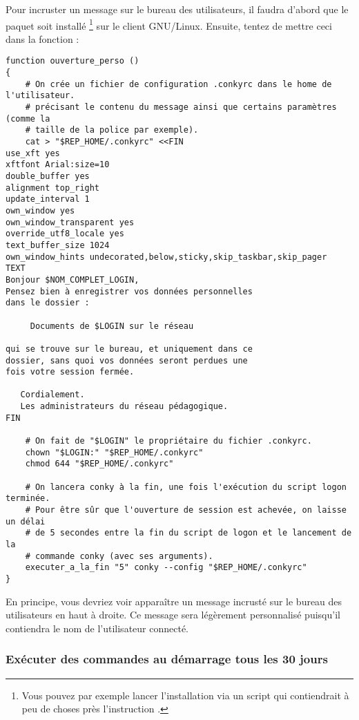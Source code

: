 Pour incruster un message sur le bureau des utilisateurs, il
faudra d'abord que le paquet  soit installé%
\footnote{Vous pouvez par exemple lancer l'installation via
un script  qui contiendrait à peu de
choses près l'instruction .}
sur le client GNU/Linux.
Ensuite, tentez de mettre ceci dans
la fonction  :
%
\begin{lstlisting}
function ouverture_perso ()
{
    # On crée un fichier de configuration .conkyrc dans le home de l'utilisateur.
    # précisant le contenu du message ainsi que certains paramètres (comme la
    # taille de la police par exemple).
    cat > "$REP_HOME/.conkyrc" <<FIN
use_xft yes
xftfont Arial:size=10
double_buffer yes
alignment top_right
update_interval 1
own_window yes
own_window_transparent yes
override_utf8_locale yes
text_buffer_size 1024
own_window_hints undecorated,below,sticky,skip_taskbar,skip_pager
TEXT
Bonjour $NOM_COMPLET_LOGIN,
Pensez bien à enregistrer vos données personnelles
dans le dossier :

     Documents de $LOGIN sur le réseau
     
qui se trouve sur le bureau, et uniquement dans ce
dossier, sans quoi vos données seront perdues une
fois votre session fermée.

   Cordialement.
   Les administrateurs du réseau pédagogique.
FIN

    # On fait de "$LOGIN" le propriétaire du fichier .conkyrc.
    chown "$LOGIN:" "$REP_HOME/.conkyrc"
    chmod 644 "$REP_HOME/.conkyrc"
    
    # On lancera conky à la fin, une fois l'exécution du script logon terminée.
    # Pour être sûr que l'ouverture de session est achevée, on laisse un délai
    # de 5 secondes entre la fin du script de logon et le lancement de la
    # commande conky (avec ses arguments).
    executer_a_la_fin "5" conky --config "$REP_HOME/.conkyrc"
}
\end{lstlisting} %
%
En principe, vous devriez voir apparaître un message incrusté
sur le bureau des utilisateurs en haut à droite. Ce message
sera légèrement personnalisé puisqu'il contiendra le nom
de l'utilisateur connecté.






\subsubsection{Exécuter des commandes au démarrage tous les 30 jours}

